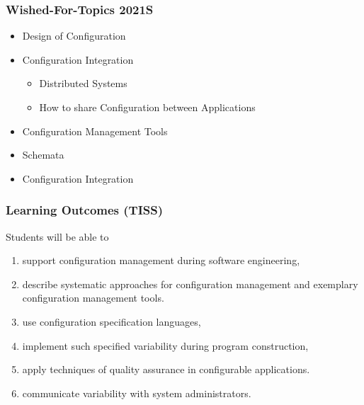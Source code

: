 \begin{frame}
	\frametitle{Wished-For-Topics 2021S}
	\begin{itemize}
	\item Design of Configuration 
	\item Configuration Integration
	\begin{itemize}
	\item Distributed Systems
	\item How to share Configuration between Applications
	\end{itemize}
	\item Configuration Management Tools
	\item Schemata
	\item Configuration Integration
	\end{itemize}
\end{frame}



\begin{frame}
	\frametitle{Learning Outcomes (TISS)}
	Students will be able to

	\begin{enumerate}
	\item support configuration management during software engineering,
	\item describe systematic approaches for configuration management and exemplary configuration management tools.
	\item use configuration specification languages,
	\item implement such specified variability during program construction,
	\item apply techniques of quality assurance in configurable applications.
	\item communicate variability with system administrators.
	\end{enumerate}
\end{frame}

